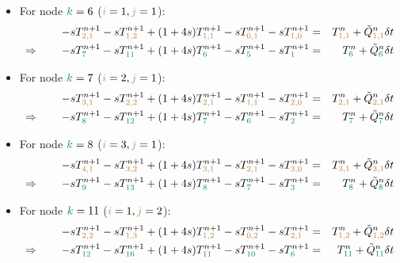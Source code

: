 \begin{itemize}
\item For node ${\color{teal}k}=6$ (${\color{brown}i}=1,{\color{brown}j}=1$):
\begin{eqnarray}
-s T_{{\color{brown}2,1}}^{n+1}
-s T_{{\color{brown}1,2}}^{n+1} 
+(1+4s)T_{{\color{brown}1,1}}^{n+1} 
-s T_{{\color{brown}0,1}}^{n+1} 
-s T_{{\color{brown}1,0}}^{n+1} 
&=& T_{{\color{brown}1,1}}^n +\tilde{Q}_{{\color{brown}1,1}}^n \delta t\nonumber\\
\Rightarrow \qquad
-s T_{{\color{teal} 7}}^{n+1}-s T_{{\color{teal} 11}}^{n+1} +(1+4s)T_{{\color{teal} 6}}^{n+1} 
-s T_{{\color{teal} 5}}^{n+1} -s T_{{\color{teal} 1}}^{n+1} 
&=& T_{{\color{teal} 6}}^n +\tilde{Q}_{{\color{teal} 6}}^n\delta t
\end{eqnarray}

\item For node ${\color{teal}k}=7$ (${\color{brown}i}=2,{\color{brown}j}=1$):
\begin{eqnarray}
-s T_{{\color{brown} 3,1}}^{n+1}
-s T_{{\color{brown}2,2}}^{n+1} 
+(1+4s)T_{{\color{brown}2,1}}^{n+1} 
-s T_{{\color{brown}1,1}}^{n+1} 
-s T_{{\color{brown}2,0}}^{n+1} 
&=& T_{{\color{brown}2,1}}^n 
+\tilde{Q}_{{\color{brown}2,1}}^n \delta t\nonumber\\
\Rightarrow \qquad
-s T_{{\color{teal} 8}}^{n+1}
-s T_{{\color{teal} 12}}^{n+1} 
+(1+4s)T_{{\color{teal}7}}^{n+1} 
-s T_{{\color{teal}6}}^{n+1} 
-s T_{{\color{teal}2}}^{n+1} 
&=& T_{{\color{teal}7}}^n 
+\tilde{Q}_{{\color{teal}7}}^n \delta t
\end{eqnarray}

\item For node ${\color{teal}k}=8$ (${\color{brown}i}=3,{\color{brown}j}=1$):
\begin{eqnarray}
-s T_{{\color{brown} 4,1}}^{n+1}
-s T_{{\color{brown}3,2}}^{n+1} 
+(1+4s)T_{{\color{brown}3,1}}^{n+1} 
-s T_{{\color{brown}2,1}}^{n+1} 
-s T_{{\color{brown}3,0}}^{n+1} 
&=& T_{{\color{brown}3,1}}^n 
+\tilde{Q}_{{\color{brown}3,1}}^n \delta t\nonumber\\
\Rightarrow \qquad
-s T_{{\color{teal} 9}}^{n+1}
-s T_{{\color{teal} 13}}^{n+1} 
+(1+4s)T_{{\color{teal}8}}^{n+1} 
-s T_{{\color{teal}7}}^{n+1} 
-s T_{{\color{teal}3}}^{n+1} 
&=& T_{{\color{teal}8}}^n 
+\tilde{Q}_{{\color{teal}8}}^n \delta t
\end{eqnarray}

\item For node ${\color{teal}k}=11$ (${\color{brown}i}=1,{\color{brown}j}=2$):
\begin{eqnarray}
-s T_{{\color{brown} 2,2}}^{n+1}
-s T_{{\color{brown}1,3}}^{n+1} 
+(1+4s)T_{{\color{brown}1,2}}^{n+1} 
-s T_{{\color{brown}0,2}}^{n+1} 
-s T_{{\color{brown}2,1}}^{n+1} 
&=& T_{{\color{brown}1,2}}^n 
+\tilde{Q}_{{\color{brown}1,2}}^n \delta t\nonumber\\
\Rightarrow \qquad
-s T_{{\color{teal} 12}}^{n+1}
-s T_{{\color{teal} 16}}^{n+1} 
+(1+4s)T_{{\color{teal}11}}^{n+1} 
-s T_{{\color{teal}10}}^{n+1} 
-s T_{{\color{teal}6}}^{n+1} 
&=& T_{{\color{teal}11}}^n 
+\tilde{Q}_{{\color{teal}11}}^n\delta t
\end{eqnarray}


\end{itemize}
